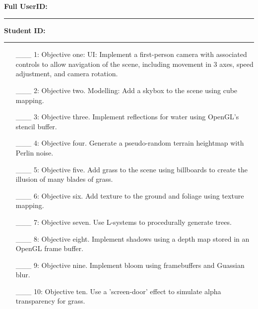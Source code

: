 \documentclass {article}
\begin{document}

{\hfill{\bf Full UserID:\rule{2in}{.1mm}}\hfill{\bf Student ID:\rule{2in}{.1mm}}\hfill}

\begin{enumerate}
     \item[\_\_\_ 1:]  Objective one: UI: Implement a first-person camera with associated controls to allow navigation of the scene, including movement in 3 axes, speed adjustment, and camera rotation.

     \item[\_\_\_ 2:]  Objective two. Modelling: Add a skybox to the scene using cube mapping.

     \item[\_\_\_ 3:]  Objective three. Implement reflections for water using OpenGL's stencil buffer.

     \item[\_\_\_ 4:]  Objective four. Generate a pseudo-random terrain heightmap with Perlin noise.

     \item[\_\_\_ 5:]  Objective five. Add grass to the scene using billboards to create the illusion of many blades of grass.

     \item[\_\_\_ 6:]  Objective six. Add texture to the ground and foliage using texture mapping.

     \item[\_\_\_ 7:]  Objective seven. Use L-systems to procedurally generate trees.

     \item[\_\_\_ 8:]  Objective eight. Implement shadows using a depth map stored in an OpenGL frame buffer.

     \item[\_\_\_ 9:]  Objective nine. Implement bloom using framebuffers and Guassian blur.

     \item[\_\_\_ 10:]  Objective ten. Use a 'screen-door' effect to simulate alpha transparency for grass.
\end{enumerate}
\end{document}
